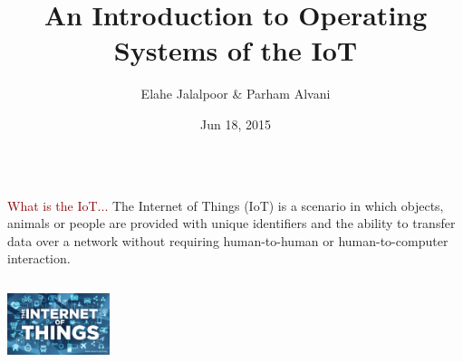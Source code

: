 \documentclass{beamer}
\title[Operating Systems of the IoT]{An Introduction to Operating Systems of the IoT}
\author{Elahe Jalalpoor \& Parham Alvani}
\institute[AUT] {
  Amirkabir University of Technology \\
  \medskip
  {\small\tt }
}
\date{Jun 18, 2015}
\begin{document}
\begin{frame}
\titlepage
\end{frame}


\section{}
\subsection{}

\begin{frame}
	\begin{columns}
		\begin{column}{10cm}
			\vspace{2cm}
			\begin{block}{
				\centering\textcolor{darkred}{What is the IoT...}}
				\justifying
				The Internet of Things (IoT) is a scenario in which objects, animals or people are provided with unique identifiers and the ability to transfer data over a network without requiring human-to-human or human-to-computer interaction.\\
			\end{block}
		\end{column}
	\end{columns}
	\vspace{.75cm}
	\hspace*{8.5cm}\includegraphics[width=3cm]{figs/Internet-of-Things-1.jpg}
\end{frame}
\end{document}
